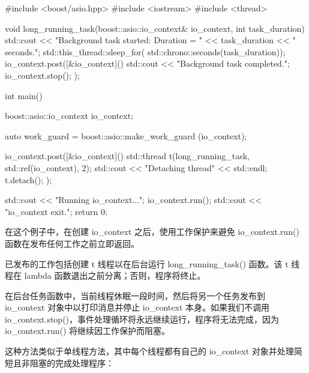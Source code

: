 \begin{cpp}
#include <boost/asio.hpp>
#include <iostream>
#include <thread>

void long_running_task(boost::asio::io_context& io_context,
                       int task_duration) {
    std::cout << "Background task started: Duration = "
              << task_duration << " seconds.\n";
    std::this_thread::sleep_for(
                      std::chrono::seconds(task_duration));
    io_context.post([&io_context]() {
        std::cout << "Background task completed.\n";
        io_context.stop();
    });
}

int main() {
    boost::asio::io_context io_context;

    auto work_guard = boost::asio::make_work_guard
                                            (io_context);

    io_context.post([&io_context]() {
        std::thread t(long_running_task,
                      std::ref(io_context), 2);
        std::cout << "Detaching thread" << std::endl;
        t.detach();
    });

    std::cout << "Running io_context...\n";
    io_context.run();
    std::cout << "io_context exit.\n";
    return 0;
}
\end{cpp}

在这个例子中，在创建 io\_context 之后，使用工作保护来避免 io\_context.run() 函数在发布任何工作之前立即返回。

已发布的工作包括创建 t 线程以在后台运行 long\_running\_task() 函数。该 t 线程在 lambda 函数退出之前分离；否则，程序将终止。

在后台任务函数中，当前线程休眠一段时间，然后将另一个任务发布到 io\_context 对象中以打印消息并停止 io\_context 本身。如果我们不调用 io\_context.stop()，事件处理循环将永远继续运行，程序将无法完成，因为 io\_context.run() 将继续因工作保护而阻塞。


这种方法类似于单线程方法，其中每个线程都有自己的 io\_context 对象并处理简短且非阻塞的完成处理程序：

